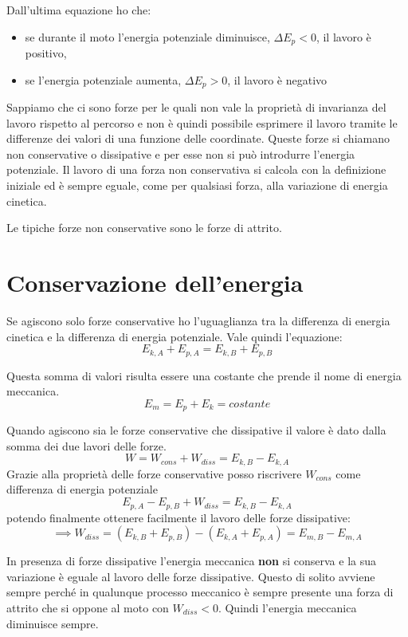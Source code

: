 \documentclass[class=book, crop=false, oneside, 12pt]{standalone}
\begin{document}
Dall'ultima equazione ho che:
\begin{itemize}
    \item se durante il moto l'energia potenziale diminuisce, \(\Delta E_p <0\), il lavoro è positivo,
    \item se l'energia potenziale aumenta, \(\Delta E_p >0\), il lavoro è negativo
\end{itemize}

Sappiamo che ci sono forze per le quali non vale la proprietà di invarianza del lavoro rispetto al percorso e non è quindi possibile esprimere il lavoro tramite le differenze dei valori di una funzione delle coordinate.
Queste forze si chiamano non conservative o dissipative e per esse non si può introdurre l'energia potenziale. Il lavoro di una forza non conservativa si calcola con la definizione iniziale ed è sempre eguale, come per qualsiasi forza, alla variazione di energia cinetica.

Le tipiche forze non conservative sono le forze di attrito.

\section{Conservazione dell'energia}

Se agiscono solo forze conservative ho l'uguaglianza tra la differenza di energia cinetica e la differenza di energia potenziale.
Vale quindi l'equazione:
\begin{equation}
    E_{k,A} + E_{p,A} = E_{k,B} + E_{p,B}
\end{equation}

Questa somma di valori risulta essere una costante che prende il nome di energia meccanica.
\begin{equation}
    E_m = E_p + E_k = costante
\end{equation}

Quando agiscono sia le forze conservative che dissipative il valore è dato dalla somma dei due lavori delle forze.
\begin{equation*}
    W = W_{cons} + W_{diss} = E_{k,B} - E_{k,A}
\end{equation*}
Grazie alla proprietà delle forze conservative posso riscrivere \(W_{cons}\) come differenza di energia potenziale
\begin{equation*}
    E_{p,A} - E_{p,B} + W_{diss} = E_{k,B} - E_{k,A}
\end{equation*}
potendo finalmente ottenere facilmente il lavoro delle forze dissipative:
\begin{equation}
    \implies W_{diss} = (E_{k,B} + E_{p,B}) - (E_{k,A} + E_{p,A}) = E_{m,B} - E_{m,A}
\end{equation}

In presenza di forze dissipative l'energia meccanica \textbf{non} si conserva e la sua variazione è eguale al lavoro delle forze dissipative.
Questo di solito avviene sempre perché in qualunque processo meccanico è sempre presente una forza di attrito che si oppone al moto con \(W_{diss}<0\).
Quindi l'energia meccanica diminuisce sempre.
\end{document}

